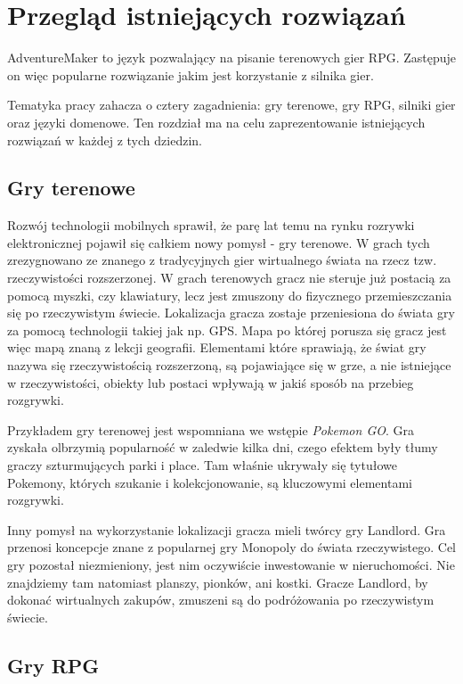 \documentclass[openright]{xmgr}
\begin{document}
\chapter{Przegląd istniejących rozwiązań}

AdventureMaker to język pozwalający na pisanie terenowych gier RPG. Zastępuje on więc popularne rozwiązanie jakim jest korzystanie z silnika gier.

Tematyka pracy zahacza o cztery zagadnienia: gry terenowe, gry RPG, silniki gier oraz języki domenowe. Ten rozdział ma na celu zaprezentowanie istniejących rozwiązań w każdej z tych dziedzin.

\section{Gry terenowe}

Rozwój technologii mobilnych sprawił, że parę lat temu na rynku rozrywki elektronicznej pojawił się całkiem nowy pomysł - gry terenowe. W grach tych zrezygnowano ze znanego z tradycyjnych gier wirtualnego świata na rzecz tzw. rzeczywistości rozszerzonej. W grach terenowych gracz nie steruje już postacią za pomocą myszki, czy klawiatury, lecz jest zmuszony do fizycznego przemieszczania się po rzeczywistym świecie. Lokalizacja gracza zostaje przeniesiona do świata gry za pomocą technologii takiej jak np. GPS. Mapa po której porusza się gracz jest więc mapą znaną z lekcji geografii. Elementami które sprawiają, że świat gry nazywa się rzeczywistością rozszerzoną, są pojawiające się w grze, a nie istniejące w rzeczywistości, obiekty lub postaci wpływają w jakiś sposób na przebieg rozgrywki.

Przykładem gry terenowej jest wspomniana we wstępie \textit{Pokemon GO}. Gra zyskała olbrzymią popularność w zaledwie kilka dni, czego efektem były tłumy graczy szturmujących parki i place. Tam właśnie ukrywały się tytułowe Pokemony, których szukanie i kolekcjonowanie, są kluczowymi elementami rozgrywki.

Inny pomysł na wykorzystanie lokalizacji gracza mieli twórcy gry Landlord. Gra przenosi koncepcje znane z popularnej gry Monopoly do świata rzeczywistego. Cel gry pozostał niezmieniony, jest nim oczywiście inwestowanie w nieruchomości. Nie znajdziemy tam natomiast planszy, pionków, ani kostki. Gracze Landlord, by dokonać wirtualnych zakupów, zmuszeni są do podróżowania po rzeczywistym świecie.

\section{Gry RPG}
\end{document}
